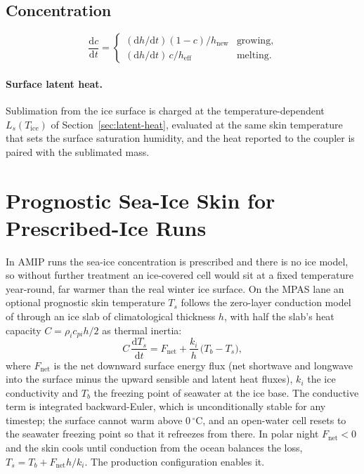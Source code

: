 \documentclass[11pt,twoside]{report}
\newcommand{\dd}{\mathrm{d}}
\newcommand{\Ls}{L_s}
\begin{document}
\subsection{Concentration}
\begin{equation}
  \frac{\dd c}{\dd t} = \begin{cases}
    (\dd h/\dd t)(1-c)/h_{\mathrm{new}} & \text{growing},\\
    (\dd h/\dd t)\,c/h_{\mathrm{eff}} & \text{melting}.
  \end{cases}
\end{equation}


\paragraph{Surface latent heat.}
Sublimation from the ice surface is charged at the temperature-dependent
$\Ls(T_{\mathrm{ice}})$ of Section~\ref{sec:latent-heat}, evaluated at the
same skin temperature that sets the surface saturation humidity, and the heat
reported to the coupler is paired with the sublimated mass.

\section{Prognostic Sea-Ice Skin for Prescribed-Ice Runs}
\label{sec:ice-skin}

In AMIP runs the sea-ice concentration is prescribed and there is no ice
model, so without further treatment an ice-covered cell would sit at a fixed
temperature year-round, far warmer than the real winter ice surface.  On the
MPAS lane an optional prognostic skin temperature $T_s$ follows the
zero-layer conduction model of \citet{Semtner1976} through an ice slab of
climatological thickness $h$, with half the slab's heat capacity
$C=\rho_i c_{pi} h/2$ as thermal inertia:
\begin{equation}
  C\,\frac{\dd T_s}{\dd t} = F_{\mathrm{net}}
  + \frac{k_i}{h}\,\bigl(T_b - T_s\bigr),
\end{equation}
where $F_{\mathrm{net}}$ is the net downward surface energy flux (net
shortwave and longwave into the surface minus the upward sensible and latent
heat fluxes), $k_i$ the ice conductivity and $T_b$ the freezing point of
seawater at the ice base.  The conductive term is integrated backward-Euler,
which is unconditionally stable for any timestep; the surface cannot warm
above 0\,$^\circ$C, and an open-water cell resets to the seawater freezing
point so that it refreezes from there.  In polar night $F_{\mathrm{net}}<0$
and the skin cools until conduction from the ocean balances the loss,
$T_s=T_b+F_{\mathrm{net}}h/k_i$.  The production configuration enables it.
\end{document}
